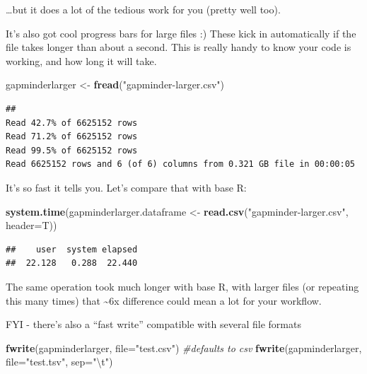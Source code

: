 \documentclass[]{article}
\newenvironment{Shaded}{\begin{snugshade}}{\end{snugshade}}
\newcommand{\KeywordTok}[1]{\textcolor[rgb]{0.13,0.29,0.53}{\textbf{{#1}}}}
\newcommand{\DataTypeTok}[1]{\textcolor[rgb]{0.13,0.29,0.53}{{#1}}}
\newcommand{\CharTok}[1]{\textcolor[rgb]{0.31,0.60,0.02}{{#1}}}
\newcommand{\StringTok}[1]{\textcolor[rgb]{0.31,0.60,0.02}{{#1}}}
\newcommand{\CommentTok}[1]{\textcolor[rgb]{0.56,0.35,0.01}{\textit{{#1}}}}
\newcommand{\NormalTok}[1]{{#1}}
\begin{document}
\ldots{}but it does a lot of the tedious work for you (pretty well too).

It's also got cool progress bars for large files :) These kick in
automatically if the file takes longer than about a second. This is
really handy to know your code is working, and how long it will take.

\begin{Shaded}
\begin{Highlighting}[]
\NormalTok{gapminderlarger <-}\StringTok{ }\KeywordTok{fread}\NormalTok{(}\StringTok{"gapminder-larger.csv"}\NormalTok{)}
\end{Highlighting}
\end{Shaded}

\begin{verbatim}
## 
Read 42.7% of 6625152 rows
Read 71.2% of 6625152 rows
Read 99.5% of 6625152 rows
Read 6625152 rows and 6 (of 6) columns from 0.321 GB file in 00:00:05
\end{verbatim}

It's so fast it tells you. Let's compare that with base R:

\begin{Shaded}
\begin{Highlighting}[]
\KeywordTok{system.time}\NormalTok{(gapminderlarger.dataframe <-}\StringTok{ }\KeywordTok{read.csv}\NormalTok{(}\StringTok{"gapminder-larger.csv"}\NormalTok{, }\DataTypeTok{header=}\NormalTok{T))}
\end{Highlighting}
\end{Shaded}

\begin{verbatim}
##    user  system elapsed 
##  22.128   0.288  22.440
\end{verbatim}

The same operation took much longer with base R, with larger files (or
repeating this many times) that \textasciitilde{}6x difference could
mean a lot for your workflow.

FYI - there's also a ``fast write'' compatible with several file formats

\begin{Shaded}
\begin{Highlighting}[]
\KeywordTok{fwrite}\NormalTok{(gapminderlarger, }\DataTypeTok{file=}\StringTok{"test.csv"}\NormalTok{) }\CommentTok{#defaults to csv}
\KeywordTok{fwrite}\NormalTok{(gapminderlarger, }\DataTypeTok{file=}\StringTok{"test.tsv"}\NormalTok{, }\DataTypeTok{sep=}\StringTok{"}\CharTok{\textbackslash{}t}\StringTok{"}\NormalTok{)}
\end{Highlighting}
\end{Shaded}
\end{document}
